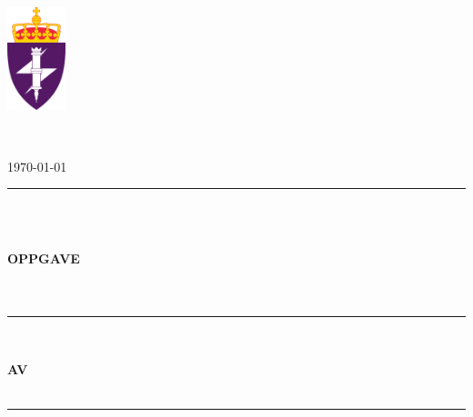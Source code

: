 \thispagestyle{empty}
\begin{minipage}{0.15\textwidth}
    \includegraphics[height=3cm]{Media/cisk.png}
\end{minipage}%
\begin{minipage}{0.4\textwidth}
    \vspace{10ex}
    \raggedright
    {\bfseries\itshape\institution}\\
    {\bfseries\itshape\laboratory}
\end{minipage}%
\begin{minipage}{0.4\textwidth}
    \vspace{13ex}
    \raggedleft
    {\today}
\end{minipage}
\vspace{1ex}

{\noindent\rule{\textwidth}{2pt}} \\ \vspace{3ex}
\begin{center}
    {\fontsize{32}{36}\selectfont \bfseries \assignmenttype}\\[6ex]
    {\fontsize{24}{28}\selectfont \bfseries OPPGAVE \assignmentno}\\[6ex]
    {\fontsize{22}{26}\selectfont \bfseries \assignmenttitle}\\[10ex]
    {\fontsize{16}{20}\selectfont \bfseries \coursecode}\\[3ex]

    {\noindent\rule{\textwidth}{2pt}} \\\vspace{5ex}

    {\fontsize{20}{24}\selectfont \bfseries AV}\\[3ex]
    {\fontsize{20}{24}\selectfont \bfseries \studentname}\\ [5ex]
\end{center}

{\noindent\rule{\textwidth}{2pt}} \\\vspace{5ex}

